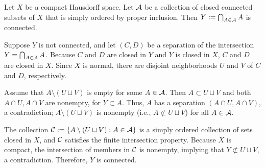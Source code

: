 \begin{prob}
    Let $X$ be a compact Hausdorff space.
    Let ${\mathcal{A}}$ be a collection of closed connected subsets of $X$ that is simply ordered by proper inclusion.
    Then $Y:=\bigcap_{A\in{\mathcal{A}}} A$ is connected.
\end{prob}
\begin{sol}
    Suppose $Y$ is not connected, and let $(C, D)$ be a separation of the intersection $Y=\bigcap_{A\in{\mathcal{A}}}A$.
    Because $C$ and $D$ are closed in $Y$ and $Y$ is closed in $X$, $C$ and $D$ are closed in $X$.
    Since $X$ is normal, there are disjoint neighborhoods $U$ and $V$ of $C$ and $D$, respectively.
    
    Assume that $A\setminus (U\sqcup V)$ is empty for some $A\in{\mathcal{A}}$.
    Then $A\subset U\sqcup V$ and both $A\cap U, A\cap V$ are nonempty, for $Y\subset A$.
    Thus, $A$ has a separation $(A\cap U, A\cap V)$, a contradiction; $A\setminus(U\sqcup V)$ is nonempty (i.e., $A\not\subset U\sqcup V$) for all $A\in{\mathcal{A}}$.
    
    The collection ${\mathcal{C}}:=\{A\setminus(U\sqcup V): A\in{\mathcal{A}}\}$ is a simply ordered collection of sets closed in $X$, and ${\mathcal{C}}$ satisfies the finite intersection property.
    Because $X$ is compact, the intersection of members in ${\mathcal{C}}$ is nonempty, implying that $Y\not\subset U\sqcup V$, a contradiction.
    Therefore, $Y$ is connected.
\end{sol}
